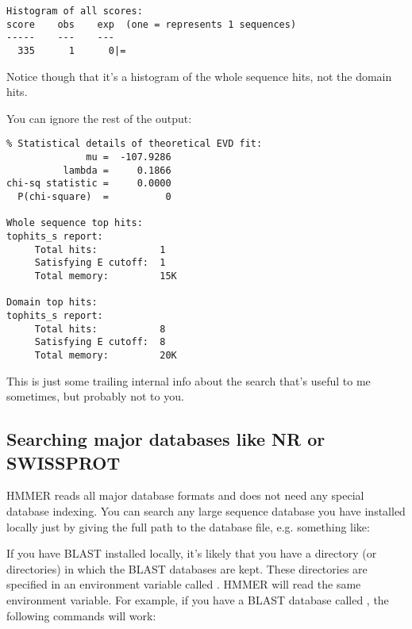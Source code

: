 {\small\begin{verbatim}
Histogram of all scores:
score    obs    exp  (one = represents 1 sequences)
-----    ---    ---
  335      1      0|=                                                          
\end{verbatim}}

Notice though that it's a histogram of the whole sequence hits, not
the domain hits.

You can ignore the rest of the  output:

{\small\begin{verbatim}
% Statistical details of theoretical EVD fit:
              mu =  -107.9286
          lambda =     0.1866
chi-sq statistic =     0.0000
  P(chi-square)  =          0

Whole sequence top hits:
tophits_s report:
     Total hits:           1
     Satisfying E cutoff:  1
     Total memory:         15K

Domain top hits:
tophits_s report:
     Total hits:           8
     Satisfying E cutoff:  8
     Total memory:         20K
\end{verbatim}}

This is just some trailing internal info about the search that's
useful to me sometimes, but probably not to you.

\subsection{Searching major databases like NR or SWISSPROT}

HMMER reads all major database formats and does not need any special
database indexing. You can search any large sequence database you have
installed locally just by giving the full path to the database file,
e.g. something like:

\vspace{1.5em}

If you have BLAST installed locally, it's likely that you have a
directory (or directories) in which the BLAST databases are kept.
These directories are specified in an environment variable called . HMMER will read the same environment variable. For example,
if you have a BLAST database called , the following commands will work:

\vspace{1.5em}

